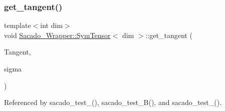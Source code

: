 \subsubsection{\texorpdfstring{get\+\_\+tangent()}{get\_tangent()}\hspace{0.1cm}{\footnotesize\ttfamily [1/2]}}
{\footnotesize\ttfamily template$<$int dim$>$ \\
void \hyperlink{classSacado__Wrapper_1_1SymTensor}{Sacado\+\_\+\+Wrapper\+::\+Sym\+Tensor}$<$ dim $>$\+::get\+\_\+tangent (\begin{DoxyParamCaption}\item[{Symmetric\+Tensor$<$ 4, dim $>$ \&}]{Tangent,  }\item[{Symmetric\+Tensor$<$ 2, dim, \hyperlink{Sacado-auxiliary__functions_8h_a868b94676739e612d9c95940e70892a9}{fad\+\_\+double} $>$ \&}]{sigma }\end{DoxyParamCaption})}



Referenced by sacado\+\_\+test\+\_(), sacado\+\_\+test\+\_\+B(), and sacado\+\_\+test\+\_().


